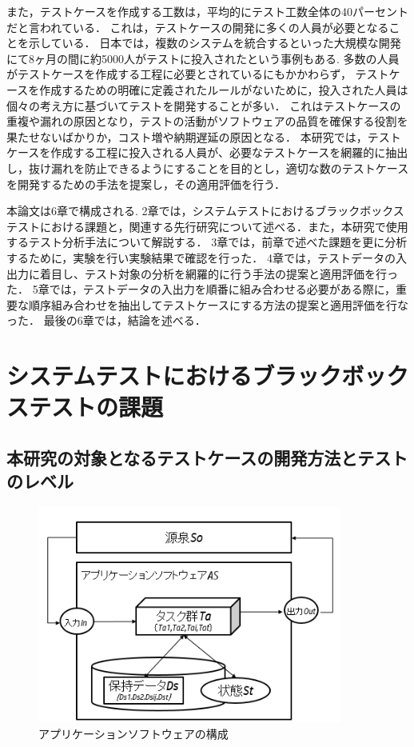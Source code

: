 \documentclass[a4paper,11pt]{jreport}
\begin{document}
また，テストケースを作成する工数は，平均的にテスト工数全体の40パーセントだと言われている\cite{van2013tpi}．
これは，テストケースの開発に多くの人員が必要となることを示している．
日本では，複数のシステムを統合するといった大規模な開発にて8ヶ月の間に約5000人がテストに投入されたという事例もある\cite{2009システム統合の}.
多数の人員がテストケースを作成する工程に必要とされているにもかかわらず， テストケースを作成するための明確に定義されたルールがないために，投入された人員は個々の考え方に基づいてテストを開発することが多い．
これはテストケースの重複や漏れの原因となり，テストの活動がソフトウェアの品質を確保する役割を果たせないばかりか，コスト増や納期遅延の原因となる．
本研究では，テストケースを作成する工程に投入される人員が、必要なテストケースを網羅的に抽出し，抜け漏れを防止できるようにすることを目的とし，適切な数のテストケースを開発するための手法を提案し，その適用評価を行う．

本論文は6章で構成される.
2章では，システムテストにおけるブラックボックステストにおける課題と，関連する先行研究について述べる．また，本研究で使用するテスト分析手法について解説する．
3章では，前章で述べた課題を更に分析するために，実験を行い実験結果で確認を行った．
4章では，テストデータの入出力に着目し、テスト対象の分析を網羅的に行う手法の提案と適用評価を行った．
5章では，テストデータの入出力を順番に組み合わせる必要がある際に，重要な順序組み合わせを抽出してテストケースにする方法の提案と適用評価を行なった．
最後の6章では，結論を述べる．

\chapter{システムテストにおけるブラックボックステストの課題}
\section{本研究の対象となるテストケースの開発方法とテストのレベル}
\begin{figure}[htbp]
  \begin{center}
  \includegraphics[width=10cm]{./image/fig-1.png}
  \caption{アプリケーションソフトウェアの構成}
  \label{fig:fig-1}
  \end{center}
\end{figure}
\end{document}
